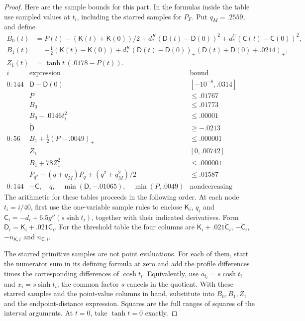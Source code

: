 \begin{proof}
Here are the sample bounds for this part. In the formulas inside the table use sampled values at \(t_i\), including the starred samples for \(P_F\). Put \(q_M=.2559\), and define
\[
\begin{aligned}
 B_0(t)&=P(t)-(\mathsf K(t)+\mathsf K(0))/2+
       d_*^K(\mathsf D(t)-\mathsf D(0))^2+d_*^C(\mathsf C(t)-\mathsf C(0))^2,\\
 B_1(t)&=-\tfrac12(\mathsf K(t)-\mathsf K(0))
     +d_*^K(\mathsf D(t)-\mathsf D(0))_+(\mathsf D(t)+\mathsf D(0)+.0214)_+,\\
 Z_1(t)&=\tanh t\,(.0178-P(t)).
\end{aligned}
\]
\[
\begin{array}{c|l|r}
 i&\text{expression}&\text{bound}\\\hline
 0{:}144&\mathsf D-\mathsf D(0)&[-10^{-8},.0314]\\
  &P&\le .01767\\
  &B_0&\le .01773\\
  &B_0-.0146 t_i^2&\le .00001\\
  &\dot{\mathsf D}&\ge -.0213\\\hline
 0{:}56&B_1+\tfrac12(P-.0049)_+&\le .000001\\
  &Z_1 &[0,.00742]\\
  &B_1+78Z_1^2 &\le .000001\\
  &P_{q^2}-(q+q_M)P_q+(q^2+q_M^2)/2&\le .01587\\\hline
 0{:}144& -\mathsf C,\quad q,\quad \min(\mathsf D,-.01065),\quad \min(P,.0049)
      &\text{nondecreasing (samples)}
\end{array}
\]
The arithmetic for these tables proceeds in the following order.
At each node $t_i=i/40$, first use the one-variable sample rules to
enclose $\mathsf K_i$, $q_i$ and
$\mathsf C_i=-d_i+6.5g''(s\sinh t_i)$, together with their indicated
derivatives. Form $\mathsf D_i=\mathsf K_i+.021\mathsf C_i$.
For the threshold table the four columns are
$\dot{\mathsf K}_i+.021\dot{\mathsf C}_i$,
$-\dot{\mathsf C}_i$, $-n_{\mathsf K,i}$ and $n_{\mathsf C,i}$.

The starred primitive samples are not point evaluations. For each
of them, start the numerator sum in its defining formula at zero and
add the profile differences times the corresponding differences of
$\cosh t_i$. Equivalently, use $a_{t_i}=s\cosh t_i$ and
$x_i=s\sinh t_i$; the common factor $s$ cancels in the quotient.
With these starred samples and the point-value columns in hand,
substitute into $B_0,B_1,Z_1$ and the endpoint-distance expression.
Squares are the full ranges of squares of the interval arguments.
At $t=0$, take $\tanh t=0$ exactly.


\end{proof}

